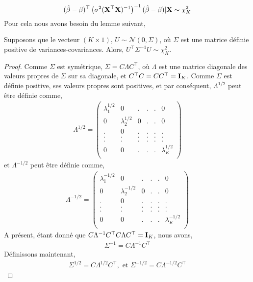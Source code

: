 \begin{align}
(\hat{\beta}-\beta)^\top\left(\sigma^2(\mathbf X^\top\mathbf X)^{-1}
\right)^{-1}
(\hat{\beta}-\beta) | \mathbf X\sim \chi^2_K
\label{eq30}
\end{align}
Pour cela nous avons besoin du lemme suivant,
\begin{lemme}
Supposons que le vecteur $(K\times 1)$, $U\sim\mathcal{N}(0, \Sigma)$, où $\Sigma$ est une matrice définie positive de variances-covariances. Alors, $U^\top\Sigma^{-1}U\sim\chi^2_K$.
\label{le2}
\end{lemme}
\begin{proof}
Comme $\Sigma$ est symétrique, $\Sigma = C\Lambda C^\top$, où $\Lambda$ est une matrice diagonale des valeurs propres de $\Sigma$ sur sa diagonale, et $C^\top C=CC^\top=\mathbf{I}_K$. Comme $\Sigma$ est définie positive, ses valeurs propres sont positives, et par conséquent, $\Lambda^{1/2}$ peut être définie comme,
\begin{align*}
\Lambda^{1/2}=
\left(
\begin{array}{cccccc}
\lambda_1^{1/2}&0&.&.&.&0\\
0&\lambda_2^{1/2}&0&.&.&0\\
.&0&.&.&.&.\\
.&.&.&.&.&.\\
.&.&.&.&.&.\\
0&0&.&.&.&\lambda_K^{1/2}\\
\end{array}
\right)
\end{align*}
et $\Lambda^{-1/2}$ peut être définie comme,
\begin{align*}
\Lambda^{-1/2}=
\left(
\begin{array}{cccccc}
\lambda_1^{-1/2}&0&.&.&.&0\\
0&\lambda_2^{-1/2}&0&.&.&0\\
.&0&.&.&.&.\\
.&.&.&.&.&.\\
.&.&.&.&.&.\\
0&0&.&.&.&\lambda_K^{-1/2}\\
\end{array}
\right)
\end{align*}
A présent, \'etant donné que $C\Lambda^{-1}C^\top C\Lambda C^\top = \mathbf{I}_K$, nous avons,
\begin{align*}
\Sigma^{-1} = C\Lambda^{-1}C^\top
\end{align*}
Définissons maintenant,
\begin{align*}
\Sigma^{1/2} = C\Lambda^{1/2}C^\top, \textrm{ \ et \ } \Sigma^{-1/2} = C\Lambda^{-1/2}C^\top

\end{align*}
\end{proof}
